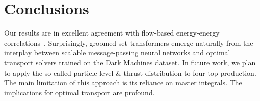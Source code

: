 \section{Conclusions}\label{sec:conclusions}

Our results are in excellent agreement with flow-based energy-energy
correlations~\cite{TPC:1742-PIZZA-Physics-Informed-Infrared-Safe-Zeta-Regularized-Z-Pole-Amplitudes-September-23-2026}.
Surprisingly, groomed set transformers emerge naturally from the
interplay between scalable message-passing neural networks and optimal
transport solvers trained on the Dark Machines dataset. In future work,
we plan to apply the so-called particle-level & thrust distribution to
four-top production. The main limitation of this approach is its
reliance on master integrals. The implications for optimal transport are
profound.

